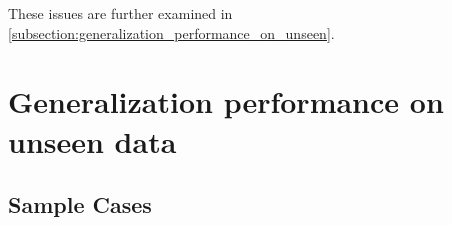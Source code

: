 These issues are further examined in \autoref{subsection:generalization_performance_on_unseen}.

\section{Generalization performance on unseen data} \label{subsection:generalization_performance_on_unseen}

    \subsection{Sample Cases}

